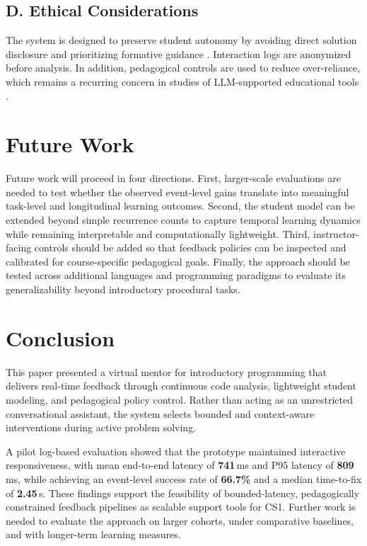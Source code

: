 \documentclass[conference]{IEEEtran}
\begin{document}
\subsection*{D. Ethical Considerations}

The system is designed to preserve student autonomy by avoiding direct solution disclosure and prioritizing formative guidance \cite{DesirableCharacteristicsforAITeachingAssistantsinProgrammingEducation}. Interaction logs are anonymized before analysis. In addition, pedagogical controls are used to reduce over-reliance, which remains a recurring concern in studies of LLM-supported educational tools \cite{CodeAid,PatternsofLLMPoweredProgrammingAssistant}.

\section{Future Work}

Future work will proceed in four directions. First, larger-scale evaluations are needed to test whether the observed event-level gains translate into meaningful task-level and longitudinal learning outcomes. Second, the student model can be extended beyond simple recurrence counts to capture temporal learning dynamics while remaining interpretable and computationally lightweight. Third, instructor-facing controls should be added so that feedback policies can be inspected and calibrated for course-specific pedagogical goals. Finally, the approach should be tested across additional languages and programming paradigms to evaluate its generalizability beyond introductory procedural tasks.

\section{Conclusion}

This paper presented a virtual mentor for introductory programming that delivers real-time feedback through continuous code analysis, lightweight student modeling, and pedagogical policy control. Rather than acting as an unrestricted conversational assistant, the system selects bounded and context-aware interventions during active problem solving.

A pilot log-based evaluation showed that the prototype maintained interactive responsiveness, with mean end-to-end latency of \textbf{741}\,ms and P95 latency of \textbf{809}\,ms, while achieving an event-level success rate of \textbf{66.7\%} and a median time-to-fix of \textbf{2.45}\,s. These findings support the feasibility of bounded-latency, pedagogically constrained feedback pipelines as scalable support tools for CS1. Further work is needed to evaluate the approach on larger cohorts, under comparative baselines, and with longer-term learning measures.
\end{document}
